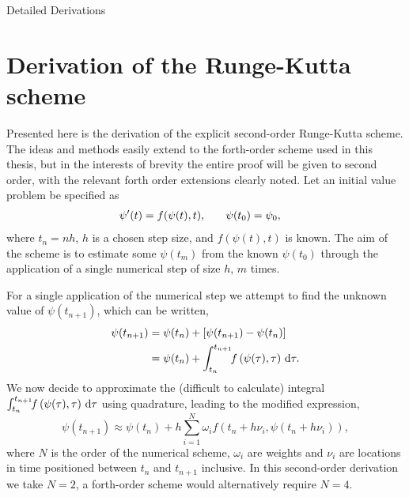 \begin{chapter}{Detailed Derivations\label{app:App2}}
\section{\label{appsection:rk4deriv} Derivation of the Runge-Kutta scheme}
Presented here is the derivation of the explicit second-order Runge-Kutta scheme. The ideas and methods easily extend to the forth-order scheme used in this thesis, but in the interests of brevity the entire proof will be given to second order, with the relevant forth order extensions clearly noted.
Let an initial value problem be specified as
\begin{align*}
  \psi'(t) &= f(\psi(t),t),\hspace{0.25in}\psi(t_0) = \psi_0,
\end{align*}
where $t_n = nh$, $h$ is a chosen step size, and $f(\psi(t),t)$ is known. The aim of the scheme is to estimate some $\psi(t_m)$ from the known $\psi(t_0)$ through the application of a single numerical step of size $h$, $m$ times.

For a single application of the numerical step we attempt to find the unknown value of $\psi(t_{n+1})$, which can be written,
\begin{align*}
\psi(t_{n+1}) &= \psi(t_n) + \left[ \psi(t_{n+1}) - \psi(t_n) \right]\\
          &= \psi(t_n) + \int_{t_n}^{t_{n+1}}\!\!f\left(\psi(\tau),\tau\right)\,{\rm d}\tau.
\end{align*}
We now decide to approximate the (difficult to calculate) integral $\int_{t_n}^{t_{n+1}}\!\!f\left(\psi(\tau),\tau\right)\,{\rm d}\tau$ using quadrature, leading to the modified expression,
\begin{equation*}
\psi(t_{n+1}) \approx \psi(t_n) + h\sum\limits_{i=1}^N \omega_i f(t_n+h\nu_i,\psi(t_n+h\nu_i)),
\end{equation*}
where $N$ is the order of the numerical scheme, $\omega_i$ are weights and $\nu_i$ are locations in time positioned between $t_n$ and $t_{n+1}$ inclusive. In this second-order derivation we take $N=2$, a forth-order scheme would alternatively require $N=4$.


\end{chapter}
